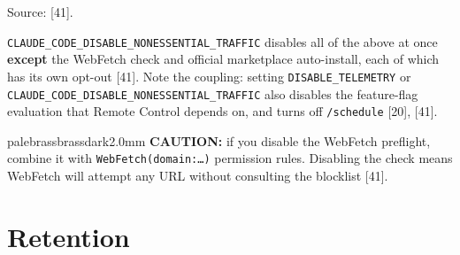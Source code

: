 \documentclass[11pt,a4paper,twoside,openany]{book}
\begin{document}
\else
  \noindent\tblbody
\fi
\par\addvspace{2.6mm}
\endgroup

Source: [41].


\texttt{CLAUDE\_\allowbreak{}CODE\_\allowbreak{}DISABLE\_\allowbreak{}NONESSENTIA\allowbreak{}L\_\allowbreak{}TRAFFIC} disables all of the above at once \textbf{except} the WebFetch check and official marketplace auto-install, each of which has its own opt-out [41]. Note the coupling: setting \texttt{DISABLE\_\allowbreak{}TELEMETRY} or \texttt{CLAUDE\_\allowbreak{}CODE\_\allowbreak{}DISABLE\_\allowbreak{}NONESSENTIA\allowbreak{}L\_\allowbreak{}TRAFFIC} also disables the feature-flag evaluation that Remote Control depends on, and turns off \texttt{/\allowbreak{}schedule} [20], [41].


\begin{calloutbox}{palebrass}{brassdark}{2.0mm}
\textbf{CAUTION:} if you disable the WebFetch preflight, combine it with \texttt{Web\allowbreak{}Fetch(domai\allowbreak{}n:\allowbreak{}…)} permission rules. Disabling the check means WebFetch will attempt any URL without consulting the blocklist [41].
\end{calloutbox}

\FloatBarrier
\setcounter{section}{1}
\section{Retention}
\end{document}
